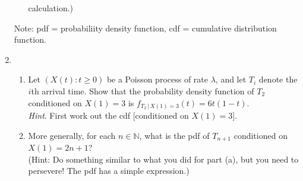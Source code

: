 \documentclass[11pt,a4paper]{article}
\begin{document}
\begin{enumerate}
\begin{enumerate}
            calculation.)
        \end{enumerate}
        Note: pdf = probabiliity density function, cdf = cumulative distribution function.
        \item 
        \begin{enumerate}
            \item Let $(X(t) : t \geq 0)$ be a Poisson process of rate $\lambda$, and let $T_i$ denote the $i$th arrival time. Show that the probability density function of $T_2$ conditioned on $X(1) = 3$ is $f_{T_2\, |\, X(1)=3}(t) = 6t(1 − t)$.\\
            \textit{Hint}. First work out the cdf [conditioned on $X(1) = 3$].
            \item More generally, for each $n \in \mathbb{N}$, what is the pdf of $T_{n+1}$ conditioned on $X(1) = 2n + 1$?\\
            (Hint: Do something similar to what you did for part (a), but you need to persevere! The pdf has a simple expression.)
        \end{enumerate}
    \end{enumerate}
\end{document}

